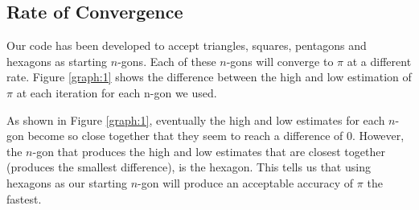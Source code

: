\documentclass{article}
\begin{document}
\subsection{Rate of Convergence}
Our code has been developed to accept triangles, squares, pentagons and hexagons as starting $n$-gons. Each of these $n$-gons will converge to $\pi$ at a different rate. Figure \ref{graph:1} shows the difference between the high and low estimation of $\pi$ at each iteration for each n-gon we used.
\par As shown in Figure \ref{graph:1}, eventually the high and low estimates for each $n$-gon become so close together that they seem to reach a difference of $0$. However, the $n$-gon that produces the high and low estimates that are closest together (produces the smallest difference), is the hexagon. This tells us that using hexagons as our starting $n$-gon will produce an acceptable accuracy of $\pi$ the fastest. \clearpage
\end{document}
